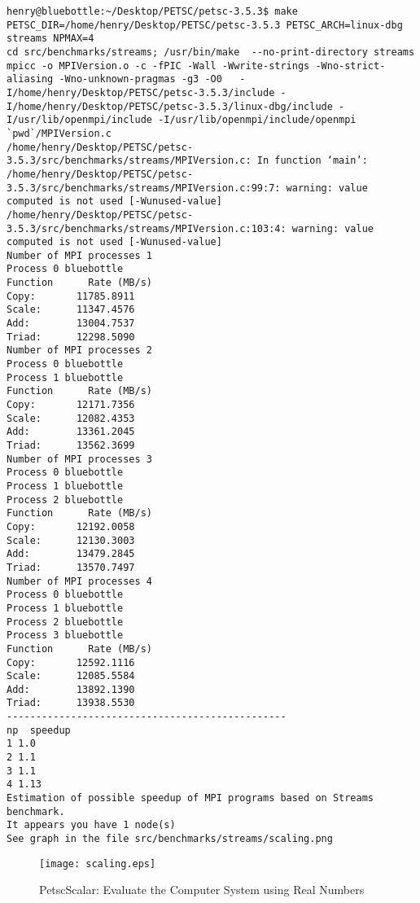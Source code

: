 \documentclass{article}
\begin{document}
\begin{scriptsize}\begin{verbatim}
henry@bluebottle:~/Desktop/PETSC/petsc-3.5.3$ make PETSC_DIR=/home/henry/Desktop/PETSC/petsc-3.5.3 PETSC_ARCH=linux-dbg streams NPMAX=4
cd src/benchmarks/streams; /usr/bin/make  --no-print-directory streams
mpicc -o MPIVersion.o -c -fPIC -Wall -Wwrite-strings -Wno-strict-aliasing -Wno-unknown-pragmas -g3 -O0   -I/home/henry/Desktop/PETSC/petsc-3.5.3/include -I/home/henry/Desktop/PETSC/petsc-3.5.3/linux-dbg/include -I/usr/lib/openmpi/include -I/usr/lib/openmpi/include/openmpi    `pwd`/MPIVersion.c
/home/henry/Desktop/PETSC/petsc-3.5.3/src/benchmarks/streams/MPIVersion.c: In function ‘main’:
/home/henry/Desktop/PETSC/petsc-3.5.3/src/benchmarks/streams/MPIVersion.c:99:7: warning: value computed is not used [-Wunused-value]
/home/henry/Desktop/PETSC/petsc-3.5.3/src/benchmarks/streams/MPIVersion.c:103:4: warning: value computed is not used [-Wunused-value]
Number of MPI processes 1
Process 0 bluebottle
Function      Rate (MB/s) 
Copy:       11785.8911
Scale:      11347.4576
Add:        13004.7537
Triad:      12298.5090
Number of MPI processes 2
Process 0 bluebottle
Process 1 bluebottle
Function      Rate (MB/s) 
Copy:       12171.7356
Scale:      12082.4353
Add:        13361.2045
Triad:      13562.3699
Number of MPI processes 3
Process 0 bluebottle
Process 1 bluebottle
Process 2 bluebottle
Function      Rate (MB/s) 
Copy:       12192.0058
Scale:      12130.3003
Add:        13479.2845
Triad:      13570.7497
Number of MPI processes 4
Process 0 bluebottle
Process 1 bluebottle
Process 2 bluebottle
Process 3 bluebottle
Function      Rate (MB/s) 
Copy:       12592.1116
Scale:      12085.5584
Add:        13892.1390
Triad:      13938.5530
------------------------------------------------
np  speedup
1 1.0
2 1.1
3 1.1
4 1.13
Estimation of possible speedup of MPI programs based on Streams benchmark.
It appears you have 1 node(s)
See graph in the file src/benchmarks/streams/scaling.png
\end{verbatim}\end{scriptsize}
\begin{figure}[htp]
    \centering
    \texttt{[image: scaling.eps]}
    \caption*{PetscScalar: Evaluate the Computer System using Real Numbers}
    \label{checkerboard_lattice}
\end{figure}
\end{document}
